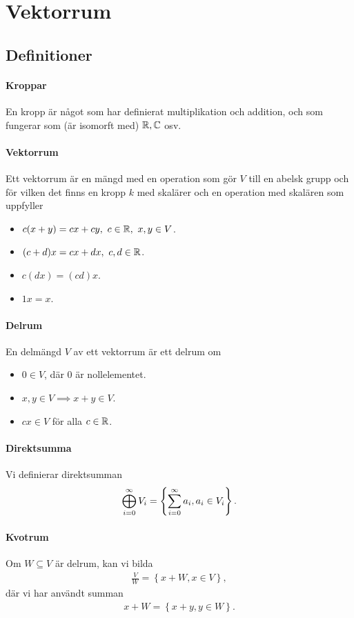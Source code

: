 \section{Vektorrum}

\subsection{Definitioner}

\paragraph{Kroppar}
En kropp är något som har definierat multiplikation och addition, och som fungerar som (är isomorft med) $\mathbb{R}, \mathbb{C}$ osv.

\paragraph{Vektorrum}
Ett vektorrum är en mängd med en operation som gör $V$ till en abelsk grupp och för vilken det finns en kropp $k$ med skalärer och en operation med skalären som uppfyller
\begin{itemize}
	\item $c(x + y) = cx + cy,~c\in\mathbb{R},~x,y\in V$.
	\item $(c + d)x = cx + dx,~c,d\in\mathbb{R}$.
	\item $c(dx) = (cd)x$.
	\item $1x = x$.
\end{itemize}

\paragraph{Delrum}
En delmängd $V$ av ett vektorrum är ett delrum om
\begin{itemize}
	\item $0\in V$, där $0$ är nollelementet.
	\item $x, y\in V\implies x + y\in V$.
	\item $cx\in V$ för alla $c\in\mathbb{R}$.
\end{itemize}

\paragraph{Direktsumma}
Vi definierar direktsumman
\begin{align*}
	\bigoplus\limits_{i = 0}^{\infty}V_{i} = \left\{\sum\limits_{i = 0}^{\infty}a_{i}, a_{i}\in V_{i}\right\}.
\end{align*}

\paragraph{Kvotrum}
Om $W\subseteq V$ är delrum, kan vi bilda
\begin{align*}
	\frac{V}{W} = \left\{x + W, x\in V\right\},
\end{align*}
där vi har användt summan
\begin{align*}
	x + W = \left\{x + y, y\in W\right\}.
\end{align*}